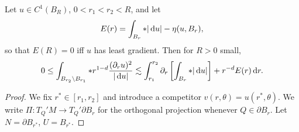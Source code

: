 \begin{lemma}\label{monotonicity lemma}
Let $u \in C^1(B_R)$, $0 < r_1 < r_2 < R$, and let 
$$E(r) = \int_{B_r} *|\mathop{}\!\mathrm{d} u| - \eta(u, B_r),$$
so that $E(R) = 0$ iff $u$ has least gradient. Then for $R > 0$ small,
\begin{equation}\label{monotonicity lemma eqn}0 \leq \int_{B_{r_2} \setminus B_{r_1}} *r^{1 - d}\frac{(\partial_ru)^2}{|\mathop{}\!\mathrm{d} u|} \lesssim \int_{r_1}^{r_2} \partial_r \left[\int_{B_r} *|\mathop{}\!\mathrm{d} u|\right] + r^{-d} E(r) \mathop{}\!\mathrm{d} r.\end{equation}
\end{lemma}
\begin{proof}
We fix $r^* \in [r_1, r_2]$ and introduce a competitor $v(r, \theta) = u(r^*, \theta)$.
We write $\Pi: T_Q'M \to T_Q'\partial B_r$ for the orthogonal projection whenever $Q \in \partial B_r$.
Let $N = \partial B_{r^*}$, $U = B_{r^*}$.


\end{proof}
